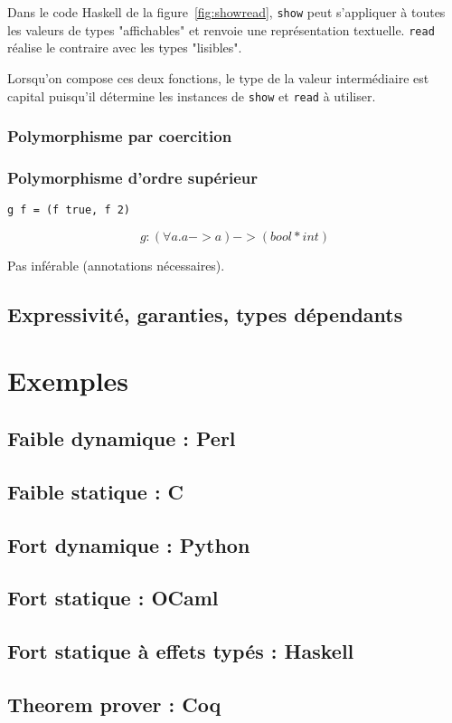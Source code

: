 Dans le code Haskell de la figure~\ref{fig:showread}, \texttt{show} peut
s'appliquer à toutes les valeurs de types "affichables" et renvoie une
représentation textuelle. \texttt{read} réalise le contraire avec les types
"lisibles".

Lorsqu'on compose ces deux fonctions, le type de la valeur intermédiaire est
capital puisqu'il détermine les instances de \texttt{show} et \texttt{read} à
utiliser.

\subsubsection{Polymorphisme par coercition}

\subsubsection{Polymorphisme d'ordre supérieur}

\begin{verbatim}
g f = (f true, f 2)
\end{verbatim}

\[
g : (\forall a . a -> a) -> (bool * int)
\]

Pas inférable (annotations nécessaires).

\subsection{Expressivité, garanties, types dépendants}

\section{Exemples}

\subsection{Faible dynamique : Perl}
\subsection{Faible statique : C}
\subsection{Fort dynamique : Python}
\subsection{Fort statique : OCaml}
\subsection{Fort statique à effets typés : Haskell}
\subsection{Theorem prover : Coq}
